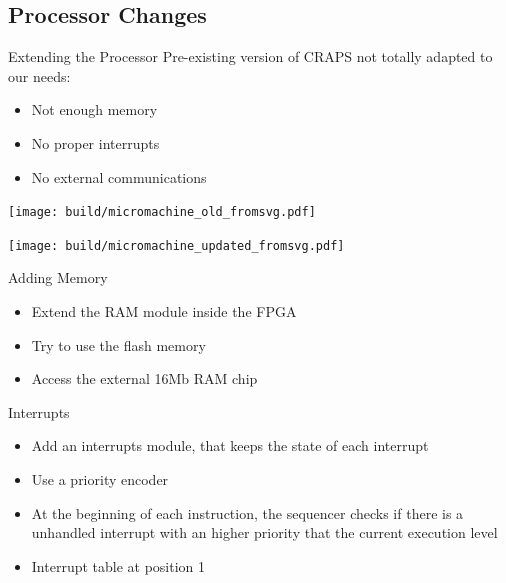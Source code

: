 \documentclass{beamer}
\begin{document}
    \subsection{Processor Changes}
    \begin{frame}{Extending the Processor}
        Pre-existing version of CRAPS not totally adapted to our needs:
        \begin{itemize}
          \item Not enough memory
          \item No proper interrupts
          \item No external communications
        \end{itemize}
    \end{frame}
    \begin{landscape}
        \begin{frame}[plain]
            \texttt{[image: build/micromachine\_old\_fromsvg.pdf]}

        \end{frame}
        \begin{frame}[plain]
            \texttt{[image: build/micromachine\_updated\_fromsvg.pdf]}

        \end{frame}
    \end{landscape}

    \begin{frame}{Adding Memory}
        \begin{itemize}
          \item Extend the RAM module inside the FPGA
          \item Try to use the flash memory
          \item Access the external 16Mb RAM chip
      \end{itemize}
    \end{frame}

    \begin{frame}{Interrupts}
      \begin{itemize}
        \item Add an interrupts module, that keeps the state of each interrupt
        \item Use a priority encoder
        \item At the beginning of each instruction, the sequencer checks if
          there is a unhandled interrupt with an higher priority that the
          current execution level
        \item Interrupt table at position 1
      \end{itemize}
    \end{frame}
\end{document}
